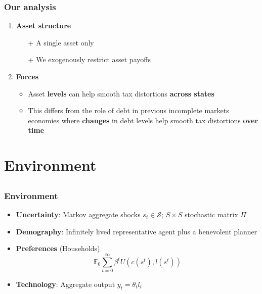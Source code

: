 \documentclass{beamer}
\begin{document}
\begin{frame}
\frametitle{Our analysis}

\begin{enumerate}
\item \textbf{Asset structure}
\begin{itemize}
\item [+] A single asset only
\item [+] We exogenously restrict asset payoffs


 \end{itemize}
\item \textbf{Forces}
\begin{itemize}
\item Asset {\color{black} \textbf{levels} } can help smooth tax distortions {\color{black} \textbf{ across  states}}
\item This differs from the  role of debt in previous incomplete markets  economies where { \color{black} \textbf{changes}} in debt levels help smooth tax distortions {\color{black}  \textbf{ over  time}}
\end{itemize}
\end{enumerate}

\end{frame}


\section{Environment}
\subsection{}

\begin{frame}
 \frametitle{Environment}
 \begin{itemize}
 \item \textbf{Uncertainty}: Markov aggregate shocks $s_t\in \mathcal{S}$; $S \times S$ stochastic matrix $\Pi$
  \item \textbf{Demography}: Infinitely lived representative agent plus a benevolent planner
  \item \textbf{Preferences }(Households)
  \begin{equation*}
\mathbb{E}_{0}\sum_{t=0}^{\infty } \beta^t  U\left(
c(s^t),l(s^t)\right)  \label{utility lifetime}
\end{equation*}%
  \item \textbf{Technology}: Aggregate output  $y_t=\theta_{t} l_{t}$
   \end{itemize}

\end{frame}
\end{document}
